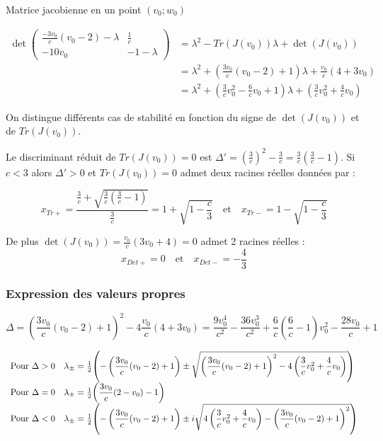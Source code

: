 \documentclass[12pt,a4paper,onecolumn]{article}
\begin{document}
Matrice jacobienne en un point $(v_0 ; w_0)$

\begin{align*}
\det
\begin{pmatrix}
\displaystyle{\frac{-3v_0}{c}(v_0-2) -\lambda} & \displaystyle{\frac{1}{c}} \\ -10v_0 & -1 - \lambda
\end{pmatrix}
		&= \lambda^2 - Tr(J(v_0)) \lambda + \det(J(v_0)) \\
        &= \lambda^2 + \left(\frac{3v_0}{c}(v_0 - 2) + 1\right)\lambda + \frac{v_0}{c}(4 + 3 v_0)\\
        &= \lambda^2 + \left(\frac{3}{c}v_0^2-\frac{6}{c}v_0 + 1\right)\lambda + \left(\frac{3}{c}v_0^2 + \frac{4}{c}v_0\right)
\end{align*}

On distingue différents cas de stabilité en fonction du signe de $ \det(J(v_0))$ et de $Tr(J(v_0))$.

Le discriminant réduit de $Tr(J(v_0)) = 0$ est $\Delta' = \left(\frac{3}{c}\right)^2 - \frac{3}{c} = \frac{3}{c}(\frac{3}{c} - 1)$. Si $c < 3$ alors $\Delta' > 0$ et $Tr(J(v_0)) = 0$ admet deux racines réelles données par :

\begin{equation}
x_{Tr+} = \displaystyle{\frac{\frac{3}{c} + \sqrt{ \frac{3}{c}(\frac{3}{c} - 1)}}{\frac{3}{c}}} = \displaystyle{1 + \sqrt{1 - \frac{c}{3}}}\quad \text{et}\quad x_{Tr-} = \displaystyle{1 - \sqrt{1 - \frac{c}{3}}}
\label{TrJ}
\end{equation}

De plus $\det(J(v_0)) = \frac{v_0}{c}(3v_0 + 4) = 0$ admet 2 racines réelles :
\begin{equation}
x_{Det+} = 0 \quad \text{et} \quad x_{Det-} = \displaystyle{-\frac{4}{3}} \label{DetJ}
\end{equation}


\subsubsection{Expression des valeurs propres}

$$\Delta = \left(\frac{3v_0}{c}(v_0 - 2) + 1\right)^2 - 4\frac{v_0}{c}(4 + 3v_0) = \frac{9v_0^4}{c^2} - \frac{36v_0^3}{c^2} + \frac{6}{c}(\frac{6}{c} - 1)v_0^2 - \frac{28v_0}{c} + 1$$


$$
\begin{array}{l l}
\text{Pour }\Delta > 0 &\lambda_{\pm} = \frac{1}{2}\displaystyle{\left(-\left(\frac{3v_0}{c}(v_0 - 2) + 1\right) \pm \sqrt{\left(\frac{3v_0}{c}(v_0 - 2) + 1\right)^2-4\left(\frac{3}{c}v_0^2 + \frac{4}{c}v_0\right)}\right)} \\
 {\text{Pour }\Delta = 0} &\lambda_{\pm} = \frac{1}{2}\displaystyle{\left(\frac{3v_0}{c}(2 - v_0) - 1\right)} \\
{\text{Pour }\Delta < 0} &\lambda_{\pm} = \frac{1}{2}\displaystyle{\left(-\left(\frac{3v_0}{c}(v_0 - 2) + 1\right) \pm i\sqrt{4\left(\frac{3}{c}v_0^2 + \frac{4}{c}v_0\right) - \left(\frac{3v_0}{c}(v_0 - 2) + 1\right)^2}\right)} \\
\end{array}
$$
\end{document}
